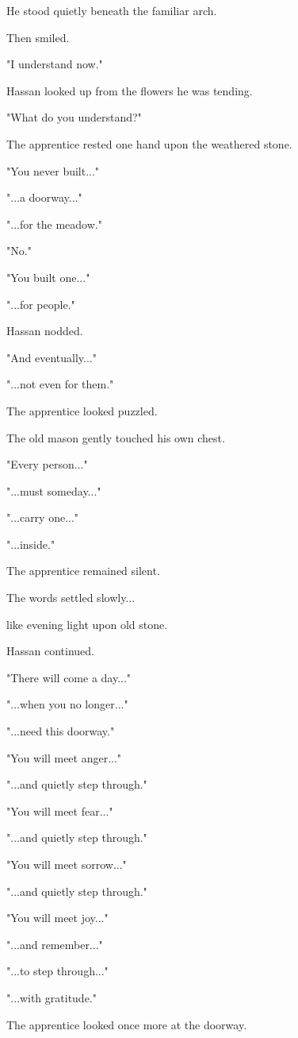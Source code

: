 \documentclass[12pt,openany]{book}
\begin{document}
He stood quietly beneath the familiar arch.

Then smiled.

"I understand now."

Hassan looked up from the flowers he was tending.

"What do you understand?"

The apprentice rested one hand upon the weathered stone.

"You never built..."

"...a doorway..."

"...for the meadow."

"No."

"You built one..."

"...for people."

Hassan nodded.

"And eventually..."

"...not even for them."

The apprentice looked puzzled.

The old mason gently touched his own chest.

"Every person..."

"...must someday..."

"...carry one..."

"...inside."

The apprentice remained silent.

The words settled slowly...

like evening light upon old stone.

Hassan continued.

"There will come a day..."

"...when you no longer..."

"...need this doorway."

"You will meet anger..."

"...and quietly step through."

"You will meet fear..."

"...and quietly step through."

"You will meet sorrow..."

"...and quietly step through."

"You will meet joy..."

"...and remember..."

"...to step through..."

"...with gratitude."

The apprentice looked once more at the doorway.
\end{document}
